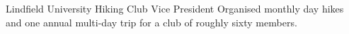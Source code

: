 {Lindfield University Hiking Club}
{Vice President}
{Organised monthly day hikes and one annual multi-day trip for a club of roughly sixty members.}
